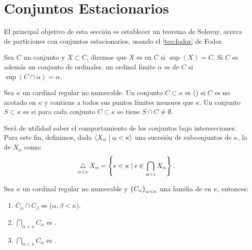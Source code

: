 \section{Conjuntos Estacionarios}

El principal objetivo de esta sección es establecer un teorema
de Solovay, acerca de particiones
con conjuntos estacionarios, usando el \cref{teo:fodor}
de Fodor.

Sea $C$ un conjunto y $X\subset C$, diremos que $X$ es 
en $C$ si $\sup(X) = C$.
Si $C$ es además un conjunto de ordinales, un ordinal límite $\alpha$ es
 de $C$ si $\sup ( C \cap\alpha ) = \alpha$.
\begin{defi}
    Sea $\kappa$ un cardinal regular no numerable. Un conjunto $C\subset \kappa$
    es  (\cna) si $C$ es no acotado en $\kappa$ y contiene a
    todos sus puntos límites menores que $\kappa$.
    Un conjunto $S\subset\kappa$ es  si para cada conjunto
    \cna{} $C\subset\kappa$ se tiene $S\cap C\neq\emptyset$.
\end{defi}

Será de utilidad saber el comportamiento de los conjuntos \cna{} bajo intersecciones.
Para este fin, definimos, dada $\langle X_\alpha\mid \alpha<\kappa \rangle$ una sucesión
de subconjuntos de $\kappa$, la  de
$X_\alpha$ como:
\[
    \operatorname*{\bigtriangleup}_{\alpha<\kappa}X_\alpha
    =
    \left\{ \epsilon<\kappa\mid\epsilon\in \bigcap_{\alpha<\epsilon}X_\alpha \right\} .
\]

\begin{teo}\label{teo:intersection-cna}
    Sea $\kappa$ un cardinal regular no numerable y $\left\{ C_\alpha \right\}_{\alpha<\kappa}$ una familia
    de \cna{} en $\kappa$, entonces:
    \begin{enumerate}[label=\alph*)]
        \item $C_\alpha\cap C_\beta$ es \cna{} ($\alpha,\beta < \kappa$).
        \item $\bigcap_{\alpha<\kappa}C_\alpha$ es \cna.
        \item $\dint_{\alpha<\kappa}C_\alpha$ es \cna.
    \end{enumerate}
\end{teo}

